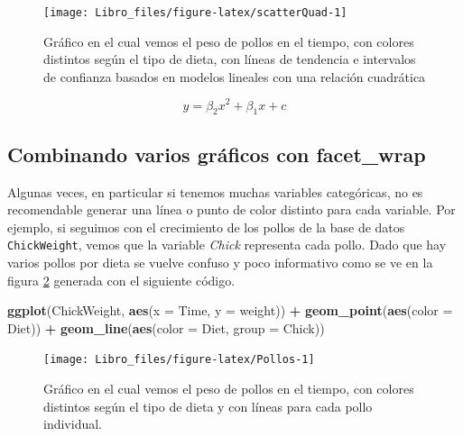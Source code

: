 \documentclass[]{book}
\newenvironment{Shaded}{\begin{snugshade}}{\end{snugshade}}
\newcommand{\DataTypeTok}[1]{\textcolor[rgb]{0.13,0.29,0.53}{#1}}
\newcommand{\KeywordTok}[1]{\textcolor[rgb]{0.13,0.29,0.53}{\textbf{#1}}}
\newcommand{\NormalTok}[1]{#1}
\newcommand{\OperatorTok}[1]{\textcolor[rgb]{0.81,0.36,0.00}{\textbf{#1}}}
\newcommand{\StringTok}[1]{\textcolor[rgb]{0.31,0.60,0.02}{#1}}
\begin{document}
\begin{figure}

{\centering \texttt{[image: Libro\_files/figure-latex/scatterQuad-1]} 

}

\caption{Gráfico en el cual vemos el peso de pollos en el tiempo, con colores distintos según el tipo de dieta, con líneas de tendencia e intervalos de confianza basados en modelos lineales con una relación cuadrática}\label{fig:scatterQuad}
\end{figure}

\begin{equation} 
  y = \beta_2 x^2 + \beta_1 x + c
  \label{eq:quad}
\end{equation}

\hypertarget{combinando-varios-graficos-con-facet_wrap}{%
\subsection{Combinando varios gráficos con
facet\_wrap}\label{combinando-varios-graficos-con-facet_wrap}}

Algunas veces, en particular si tenemos muchas variables categóricas, no
es recomendable generar una línea o punto de color distinto para cada
variable. Por ejemplo, si seguimos con el crecimiento de los pollos de
la base de datos \texttt{ChickWeight}, vemos que la variable
\emph{Chick} representa cada pollo. Dado que hay varios pollos por dieta
se vuelve confuso y poco informativo como se ve en la figura
\ref{fig:Pollos} generada con el siguiente código.

\begin{Shaded}
\begin{Highlighting}[]
\KeywordTok{ggplot}\NormalTok{(ChickWeight, }\KeywordTok{aes}\NormalTok{(}\DataTypeTok{x =}\NormalTok{ Time, }\DataTypeTok{y =}\NormalTok{ weight)) }\OperatorTok{+}\StringTok{ }\KeywordTok{geom_point}\NormalTok{(}\KeywordTok{aes}\NormalTok{(}\DataTypeTok{color =}\NormalTok{ Diet)) }\OperatorTok{+}\StringTok{ }
\StringTok{    }\KeywordTok{geom_line}\NormalTok{(}\KeywordTok{aes}\NormalTok{(}\DataTypeTok{color =}\NormalTok{ Diet, }\DataTypeTok{group =}\NormalTok{ Chick))}
\end{Highlighting}
\end{Shaded}

\begin{figure}

{\centering \texttt{[image: Libro\_files/figure-latex/Pollos-1]} 

}

\caption{Gráfico en el cual vemos el peso de pollos en el tiempo, con colores distintos según el tipo de dieta y con líneas para cada pollo individual.}\label{fig:Pollos}
\end{figure}
\end{document}
